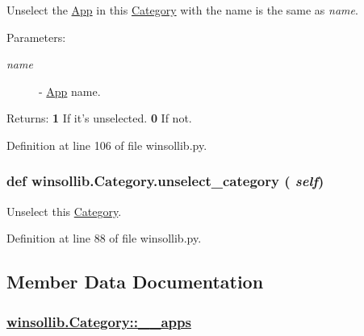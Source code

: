 Unselect the \hyperlink{classwinsollib_1_1App}{App} in this \hyperlink{classwinsollib_1_1Category}{Category} with the name is the same as {\em name\/}. 

\begin{Desc}
\item[Parameters:]
\begin{description}
\item[{\em name}]- \hyperlink{classwinsollib_1_1App}{App} name. \end{description}
\end{Desc}
\begin{Desc}
\item[Returns:]{\bf 1} If it's unselected. {\bf 0} If not. \end{Desc}


Definition at line 106 of file winsollib.py.\hypertarget{classwinsollib_1_1Category_5673807f0d4c7462549baafd86b9b17a}{
\subsubsection[unselect\_\-category]{\setlength{\rightskip}{0pt plus 5cm}def winsollib.Category.unselect\_\-category ( {\em self})}}
\label{classwinsollib_1_1Category_5673807f0d4c7462549baafd86b9b17a}


Unselect this \hyperlink{classwinsollib_1_1Category}{Category}. 



Definition at line 88 of file winsollib.py.

\subsection{Member Data Documentation}
\hypertarget{classwinsollib_1_1Category_e30337cdf109003959f326527a23c231}{
\subsubsection[\_\-\_\-apps]{\setlength{\rightskip}{0pt plus 5cm}\hyperlink{classwinsollib_1_1Category_e30337cdf109003959f326527a23c231}{winsollib.Category::\_\-\_\-apps}}}
\label{classwinsollib_1_1Category_e30337cdf109003959f326527a23c231}


